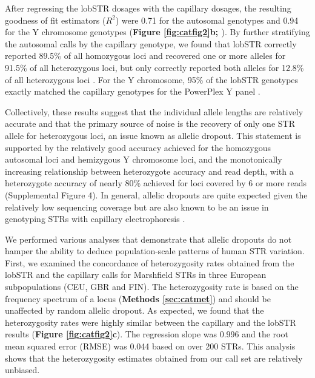 After regressing the lobSTR dosages with the capillary dosages, the resulting goodness of fit estimators ($R^2$) were 0.71 for the autosomal genotypes and 0.94 for the Y chromosome genotypes (\textbf{Figure \ref{fig:catfig2}b; \cite{SuppWillemsGymrekHighnamEtAl2014}}). By further stratifying the autosomal calls by the capillary genotype, we found that lobSTR correctly reported 89.5\% of all homozygous loci and recovered one or more alleles for 91.5\% of all heterozygous loci, but only correctly reported both alleles for 12.8\% of all heterozygous loci \cite{SuppWillemsGymrekHighnamEtAl2014}. For the Y chromosome, 95\% of the lobSTR genotypes exactly matched the capillary genotypes for the PowerPlex Y panel \cite{SuppWillemsGymrekHighnamEtAl2014}. 

Collectively, these results suggest that the individual allele lengths are relatively accurate and that the primary source of noise is the recovery of only one STR allele for heterozygous loci, an issue known as allelic dropout. This statement is supported by the relatively good accuracy achieved for the homozygous autosomal loci and hemizygous Y chromosome loci, and the monotonically increasing relationship between heterozygote accuracy and read depth, with a heterozygote accuracy of nearly 80\% achieved for loci covered by 6 or more reads (Supplemental Figure 4). In general, allelic dropouts are quite expected given the relatively low sequencing coverage but are also known to be an issue in genotyping STRs with capillary electrophoresis \cite{PompanonBoninBellemainEtAl2005}.   

We performed various analyses that demonstrate that allelic dropouts do not hamper the ability to deduce population-scale patterns of human STR variation. First, we examined the concordance of heterozygosity rates obtained from the lobSTR and the capillary calls for Marshfield STRs in three European subpopulations (CEU, GBR and FIN). The heterozygosity rate is based on the frequency spectrum of a locus (\textbf{Methods \ref{sec:catmet}}) and should be unaffected by random allelic dropout. As expected, we found that the heterozygosity rates were highly similar between the capillary and the lobSTR results (\textbf{Figure \ref{fig:catfig2}c}). The regression slope was 0.996 and the root mean squared error (RMSE) was 0.044 based on over 200 STRs. This analysis shows that the heterozygosity estimates obtained from our call set are relatively unbiased. 

